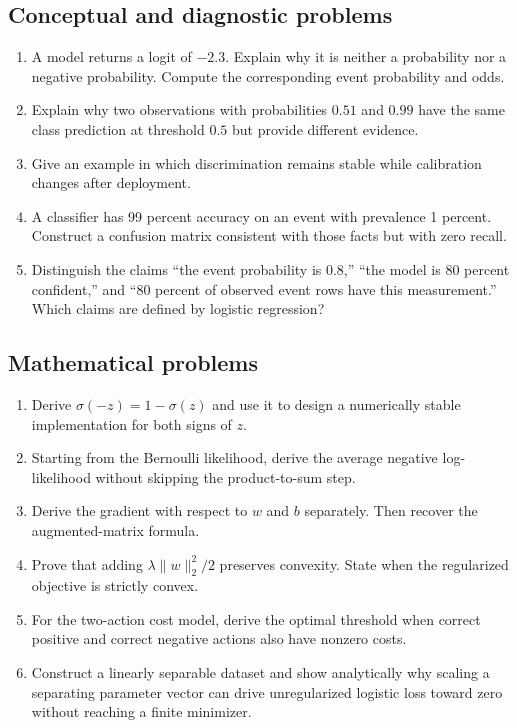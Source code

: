 \subsection*{Conceptual and diagnostic problems}
\begin{enumerate}[label=\textbf{C\arabic*.}]
  \item A model returns a logit of $-2.3$. Explain why it is neither a
  probability nor a negative probability. Compute the corresponding event
  probability and odds.
  \item Explain why two observations with probabilities $0.51$ and $0.99$ have
  the same class prediction at threshold $0.5$ but provide different evidence.
  \item Give an example in which discrimination remains stable while
  calibration changes after deployment.
  \item A classifier has 99 percent accuracy on an event with prevalence
  1 percent. Construct a confusion matrix consistent with those facts but with
  zero recall.
  \item Distinguish the claims ``the event probability is 0.8,'' ``the model is
  80 percent confident,'' and ``80 percent of observed event rows have this
  measurement.'' Which claims are defined by logistic regression?
\end{enumerate}

\subsection*{Mathematical problems}
\begin{enumerate}[label=\textbf{M\arabic*.}]
  \item Derive $\sigma(-z)=1-\sigma(z)$ and use it to design a numerically stable
  implementation for both signs of $z$.
  \item Starting from the Bernoulli likelihood, derive the average negative
  log-likelihood without skipping the product-to-sum step.
  \item Derive the gradient with respect to $w$ and $b$ separately. Then recover
  the augmented-matrix formula.
  \item Prove that adding $\lambda\lVert w\rVert_2^2/2$ preserves convexity.
  State when the regularized objective is strictly convex.
  \item For the two-action cost model, derive the optimal threshold when correct
  positive and correct negative actions also have nonzero costs.
  \item Construct a linearly separable dataset and show analytically why scaling
  a separating parameter vector can drive unregularized logistic loss toward
  zero without reaching a finite minimizer.
\end{enumerate}

